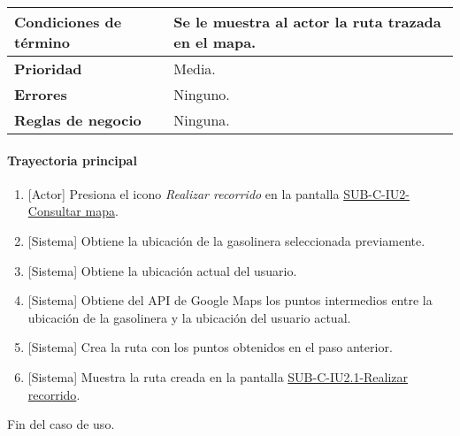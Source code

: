 \begin{longtable}{|J{5cm}|J{10.3cm}|}
	\textbf{Condiciones de término} & Se le muestra al actor la ruta trazada en el mapa.
		\\ \hline 
	\textbf{Prioridad} & 
		Media. \\ \hline
	\textbf{Errores} & Ninguno.
		\\ \hline
	\textbf{Reglas de negocio} & Ninguna.
		 \\ \hline
\end{longtable}

\paragraph{Trayectoria principal}
	\begin{enumerate}
		\item {[Actor]} Presiona el icono \textit{Realizar recorrido} en la pantalla \hyperref[fig:sub-c-iu2]{SUB-C-IU2-Consultar mapa}.
		\item {[Sistema]} Obtiene la ubicación de la gasolinera seleccionada previamente.
		\item {[Sistema]} Obtiene la ubicación actual del usuario.
		\item {[Sistema]} Obtiene del API de Google Maps los puntos intermedios entre la ubicación de la gasolinera y la ubicación del usuario actual.
		\item {[Sistema]} Crea la ruta con los puntos obtenidos en el paso anterior.
		\item {[Sistema]} Muestra la ruta creada en la pantalla \hyperref[fig:sub-c-iu2.1]{SUB-C-IU2.1-Realizar recorrido}.
	\end{enumerate}
	Fin del caso de uso.

